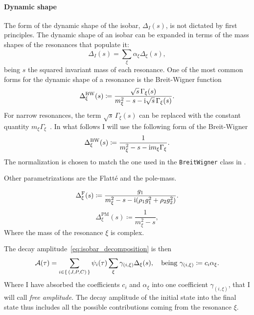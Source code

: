         \paragraph{Dynamic shape}
        The form of the dynamic shape of the isobar, $\Delta_I(s)$, is not dictated by first principles.
        The dynamic shape of an isobar can be expanded in terms of the mass shapes of the resonances that populate it:
        \begin{equation}\label{eq:isobar_mass_shape_expansion}
            \Delta_I(s) = \sum_{\xi} \alpha_{\xi}\Delta_{\xi}(s),
        \end{equation}
        being $s$ the squared invariant mass of each resonance.
        One of the most common forms for the dynamic shape of a resonance is the Breit-Wigner function
        \begin{equation}
            \Delta_{\xi}^{\text{BW}}(s) \coloneqq \frac{\sqrt{s}\,\Gamma_{\xi}(s)}{m_{\xi}^2 - s - \mathrm{i} \sqrt{s}\, \Gamma_{\xi}(s)}.
        \end{equation}
        For narrow resonances, the term $\sqrt{s}\,\Gamma_{\xi}(s)$ can be replaced with the constant quantity $m_{\xi}\Gamma_{\xi}$~\cite[\S~47.2.1]{chinese_phisics}.
        In what follows I will use the following form of the Breit-Wigner
        \begin{equation}
            \Delta_{\xi}^{\text{BW}}(s) \coloneqq \frac{1}{m_{\xi}^2 - s - \mathrm{i} m_{\xi} \Gamma_{\xi}}.
        \end{equation}
        The normalization is chosen to match the one used in the \lstinline!BreitWigner! class in .


        {\color{red} Other parametrizations are the Flatté and the pole-mass.}

        \begin{equation}
            \Delta_{\xi}^{\text{F}}(s) \coloneqq \frac{g_1}{m_{\xi}^2 - s - \mathrm{i}(\rho_1 g_1^2 + \rho_2 g_2^2)}.
        \end{equation}
        \begin{equation}
            \Delta_{\xi}^{\text{PM}}(s) \coloneqq \frac{1}{m_{\xi}^2 - s},
        \end{equation}
        Where the mass of the resonance $\xi$ is complex.

        The decay amplitude~\eqref{eq:isobar_decomposition} is then 
        \begin{equation}
            \mathcal{A}(\tau) = \sum_{i\in\set{(J, P, C)}} \psi_i(\tau) \sum_{\xi} \gamma_{(i,\xi)} \Delta_{\xi}(s),\quad
            \text{being }
            \gamma_{(i,\xi)}\coloneqq c_i \alpha_{\xi}.
        \end{equation}
        Where I have absorbed the coefficients $c_i$ and $\alpha_\xi$ into one coefficient $\gamma_{(i,\xi)}$, that I will call \emph{free amplitude}.
    The decay amplitude of the initial state into the final state thus includes all the possible contributions coming from the resonance $\xi$.


